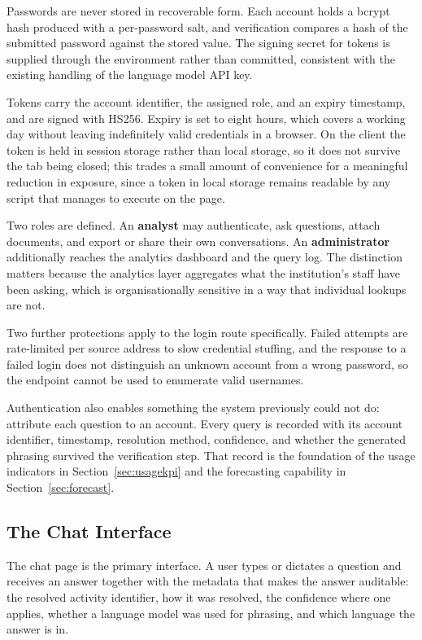 Passwords are never stored in recoverable form. Each account holds a bcrypt hash produced with a per-password salt, and verification compares a hash of the submitted password against the stored value. The signing secret for tokens is supplied through the environment rather than committed, consistent with the existing handling of the language model API key.

Tokens carry the account identifier, the assigned role, and an expiry timestamp, and are signed with HS256. Expiry is set to eight hours, which covers a working day without leaving indefinitely valid credentials in a browser. On the client the token is held in session storage rather than local storage, so it does not survive the tab being closed; this trades a small amount of convenience for a meaningful reduction in exposure, since a token in local storage remains readable by any script that manages to execute on the page.

Two roles are defined. An \textbf{analyst} may authenticate, ask questions, attach documents, and export or share their own conversations. An \textbf{administrator} additionally reaches the analytics dashboard and the query log. The distinction matters because the analytics layer aggregates what the institution's staff have been asking, which is organisationally sensitive in a way that individual lookups are not.

Two further protections apply to the login route specifically. Failed attempts are rate-limited per source address to slow credential stuffing, and the response to a failed login does not distinguish an unknown account from a wrong password, so the endpoint cannot be used to enumerate valid usernames.

Authentication also enables something the system previously could not do: attribute each question to an account. Every query is recorded with its account identifier, timestamp, resolution method, confidence, and whether the generated phrasing survived the verification step. That record is the foundation of the usage indicators in Section~\ref{sec:usagekpi} and the forecasting capability in Section~\ref{sec:forecast}.

\subsection{The Chat Interface}

The chat page is the primary interface. A user types or dictates a question and receives an answer together with the metadata that makes the answer auditable: the resolved activity identifier, how it was resolved, the confidence where one applies, whether a language model was used for phrasing, and which language the answer is in.

